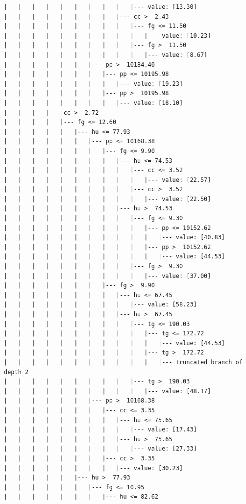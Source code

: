 \documentclass[UTF8, a4paper]{ctexart}
\begin{document}
\begin{lstlisting}
|   |   |   |   |   |   |   |   |   |--- value: [13.30]
|   |   |   |   |   |   |   |   |--- cc >  2.43
|   |   |   |   |   |   |   |   |   |--- fg <= 11.50
|   |   |   |   |   |   |   |   |   |   |--- value: [10.23]
|   |   |   |   |   |   |   |   |   |--- fg >  11.50
|   |   |   |   |   |   |   |   |   |   |--- value: [8.67]
|   |   |   |   |   |   |--- pp >  10184.40
|   |   |   |   |   |   |   |--- pp <= 10195.98
|   |   |   |   |   |   |   |   |--- value: [19.23]
|   |   |   |   |   |   |   |--- pp >  10195.98
|   |   |   |   |   |   |   |   |--- value: [18.10]
|   |   |   |--- cc >  2.72
|   |   |   |   |--- fg <= 12.60
|   |   |   |   |   |--- hu <= 77.93
|   |   |   |   |   |   |--- pp <= 10168.38
|   |   |   |   |   |   |   |--- fg <= 9.90
|   |   |   |   |   |   |   |   |--- hu <= 74.53
|   |   |   |   |   |   |   |   |   |--- cc <= 3.52
|   |   |   |   |   |   |   |   |   |   |--- value: [22.57]
|   |   |   |   |   |   |   |   |   |--- cc >  3.52
|   |   |   |   |   |   |   |   |   |   |--- value: [22.50]
|   |   |   |   |   |   |   |   |--- hu >  74.53
|   |   |   |   |   |   |   |   |   |--- fg <= 9.30
|   |   |   |   |   |   |   |   |   |   |--- pp <= 10152.62
|   |   |   |   |   |   |   |   |   |   |   |--- value: [40.83]
|   |   |   |   |   |   |   |   |   |   |--- pp >  10152.62
|   |   |   |   |   |   |   |   |   |   |   |--- value: [44.53]
|   |   |   |   |   |   |   |   |   |--- fg >  9.30
|   |   |   |   |   |   |   |   |   |   |--- value: [37.00]
|   |   |   |   |   |   |   |--- fg >  9.90
|   |   |   |   |   |   |   |   |--- hu <= 67.45
|   |   |   |   |   |   |   |   |   |--- value: [58.23]
|   |   |   |   |   |   |   |   |--- hu >  67.45
|   |   |   |   |   |   |   |   |   |--- tg <= 190.03
|   |   |   |   |   |   |   |   |   |   |--- tg <= 172.72
|   |   |   |   |   |   |   |   |   |   |   |--- value: [44.53]
|   |   |   |   |   |   |   |   |   |   |--- tg >  172.72
|   |   |   |   |   |   |   |   |   |   |   |--- truncated branch of depth 2
|   |   |   |   |   |   |   |   |   |--- tg >  190.03
|   |   |   |   |   |   |   |   |   |   |--- value: [48.17]
|   |   |   |   |   |   |--- pp >  10168.38
|   |   |   |   |   |   |   |--- cc <= 3.35
|   |   |   |   |   |   |   |   |--- hu <= 75.65
|   |   |   |   |   |   |   |   |   |--- value: [17.43]
|   |   |   |   |   |   |   |   |--- hu >  75.65
|   |   |   |   |   |   |   |   |   |--- value: [27.33]
|   |   |   |   |   |   |   |--- cc >  3.35
|   |   |   |   |   |   |   |   |--- value: [30.23]
|   |   |   |   |   |--- hu >  77.93
|   |   |   |   |   |   |--- fg <= 10.95
|   |   |   |   |   |   |   |--- hu <= 82.62

\end{lstlisting}
\end{document}
